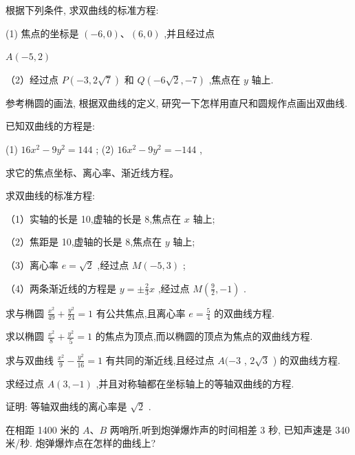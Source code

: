 \documentclass[lang=cn,newtx,10pt,scheme=chinese]{elegantbook}
\begin{document}
\begin{problemset}[习 题 七]

\item 根据下列条件, 求双曲线的标准方程:

(1) 焦点的坐标是 \(\left( {-6,0}\right) \text{、}\left( {6,0}\right)\) ,并且经过点

\(A\left( {-5,2}\right)\)

（2）经过点 \(P\left( {-3,2\sqrt{7}}\right)\) 和 \(Q\left( {-6\sqrt{2}, - 7}\right)\) ,焦点在 \(y\) 轴上.

\item 参考椭圆的画法, 根据双曲线的定义, 研究一下怎样用直尺和圆规作点画出双曲线.

\item 已知双曲线的方程是:

(1) \({16}{x}^{2} - 9{y}^{2} = {144}\) ; (2) \({16}{x}^{2} - 9{y}^{2} = - {144}\) ,

求它的焦点坐标、离心率、渐近线方程。

\item 求双曲线的标准方程:

（1）实轴的长是 10,虚轴的长是 8,焦点在 \(x\) 轴上;

（2）焦距是 10,虚轴的长是 8,焦点在 \(y\) 轴上;

（3）离心率 \(e = \sqrt{2}\) ,经过点 \(M\left( {-5,3}\right)\) ;

（4）两条渐近线的方程是 \(y = \pm \frac{2}{3}x\) ,经过点 \(M\left( {\frac{9}{2}, - 1}\right)\) .

\item 求与椭圆 \(\frac{{x}^{2}}{49} + \frac{{y}^{2}}{24} = 1\) 有公共焦点,且离心率 \(e = \frac{5}{4}\) 的双曲线方程.

\item 求以椭圆 \(\frac{{x}^{2}}{8} + \frac{{y}^{2}}{5} = 1\) 的焦点为顶点,而以椭圆的顶点为焦点的双曲线方程.

\item 求与双曲线 \(\frac{{x}^{2}}{9} - \frac{{y}^{2}}{16} = 1\) 有共同的渐近线,且经过点 \(A( - 3\) , \(2\sqrt{3}\) ) 的双曲线方程.

\item 求经过点 \(A\left( {3, - 1}\right)\) ,并且对称轴都在坐标轴上的等轴双曲线的方程.

\item 证明: 等轴双曲线的离心率是 \(\sqrt{2}\) .

\item 在相距 1400 米的 \(A\text{、}B\) 两哨所,听到炮弹爆炸声的时间相差 3 秒, 已知声速是 340 米/秒. 炮弹爆炸点在怎样的曲线上?


\end{problemset}
\end{document}
